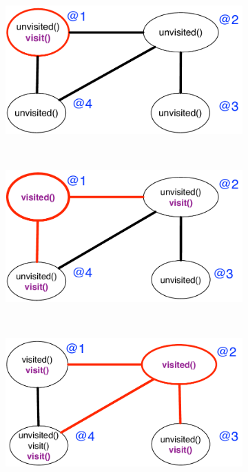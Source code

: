 \begin{figure}[h]
        \centering
        \begin{subfigure}[b]{0.45\textwidth}
                \includegraphics[width=\textwidth]{figures/visit/trace1}
                \label{fig:exec_trace1}
        \end{subfigure}%
        ~ %
        \begin{subfigure}[b]{0.45\textwidth}
                \includegraphics[width=\textwidth]{figures/visit/trace2}
                \label{fig:exec_trace2}
        \end{subfigure}\\
        \begin{subfigure}[b]{0.45\textwidth}
                \includegraphics[width=\textwidth]{figures/visit/trace3}

\end{subfigure}
\end{figure}
